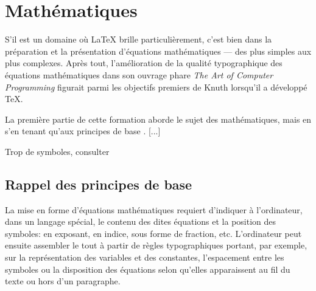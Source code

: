 \chapter{Mathématiques}
\label{chap:math}


S'il est un domaine où {\LaTeX} brille particulièrement, c'est bien
dans la préparation et la présentation d'équations mathématiques ---
des plus simples aux plus complexes. Après tout, l'amélioration de la
qualité typographique des équations mathématiques dans son ouvrage
phare \emph{The Art of Computer Programming} figurait parmi les
objectifs premiers de Knuth lorsqu'il a développé {\TeX}.

La première partie de cette formation aborde le sujet des
mathématiques, mais en s'en tenant qu'aux principes de base
\citep[section~7]{UL:latex:1}. [...]

Trop de symboles, consulter \citet{comprehensive} %


\section{Rappel des principes de base}
\label{sec:math:rappel}

La mise en forme d'équations mathématiques requiert d'indiquer à
l'ordinateur, dans un langage spécial, le contenu des dites équations
et la position des symboles: en exposant, en indice, sous forme de
fraction, etc. L'ordinateur peut ensuite assembler le tout à partir de
règles typographiques portant, par exemple, sur la représentation des
variables et des constantes, l'espacement entre les symboles ou la
disposition des équations selon qu'elles apparaissent au fil du texte
ou hors d'un paragraphe.

